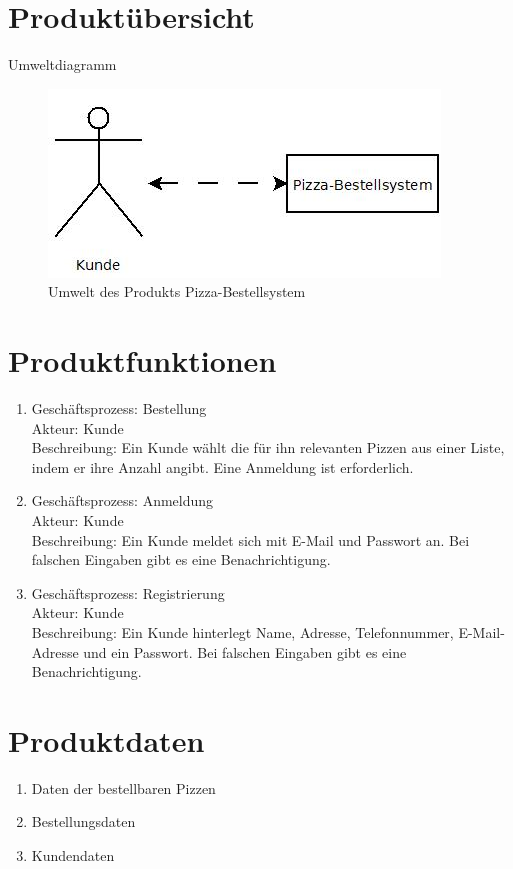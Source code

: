 \section{Produktübersicht}
Umweltdiagramm
\begin{figure}[htp]
	\centering
\includegraphics[keepaspectratio]{Umweltdiagramm.jpeg}
\caption {Umwelt des Produkts Pizza-Bestellsystem}
\end{figure}
\section{Produktfunktionen}
\begin{enumerate}[/LF10/]
	\item Geschäftsprozess: Bestellung\\
	Akteur: Kunde\\
	Beschreibung: Ein Kunde wählt die für ihn relevanten Pizzen aus einer Liste, indem er ihre Anzahl angibt. Eine Anmeldung ist erforderlich.
	\item Geschäftsprozess: Anmeldung\\
	Akteur: Kunde\\
	Beschreibung: Ein Kunde meldet sich mit E-Mail und Passwort an. Bei falschen Eingaben gibt es eine Benachrichtigung.
	\item Geschäftsprozess: Registrierung\\
	Akteur: Kunde\\
	Beschreibung: Ein Kunde hinterlegt Name, Adresse, Telefonnummer, E-Mail-Adresse und ein Passwort. Bei falschen Eingaben gibt es eine Benachrichtigung.
\end{enumerate}
\section{Produktdaten}
\begin{enumerate}[/LD10/]
	\item Daten der bestellbaren Pizzen
	\item Bestellungsdaten
	\item Kundendaten
\end{enumerate}
